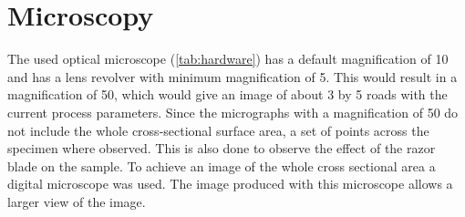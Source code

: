 \section{Microscopy}
The used optical microscope  (\ref{tab:hardware}) has a default magnification of 10 and has a lens revolver with minimum magnification of 5. This would result in a magnification of 50, which would give an image of about 3 by 5 roads with the current process parameters.
Since the micrographs with a magnification of 50 do not include the whole cross-sectional surface area, a set of points across the specimen where observed. This is also done to observe the effect of the razor blade on the sample.
To achieve an image of the whole cross sectional area a digital microscope was used. The image produced with this microscope allows a larger view of the image.




